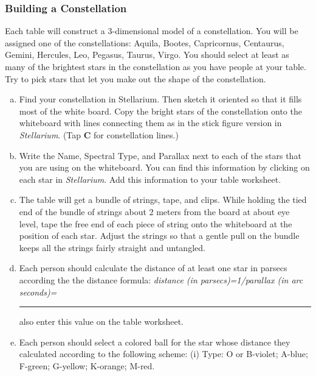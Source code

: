 \documentclass[main.tex]{subfiles}
\begin{document}
\subsubsection{Building a Constellation}
Each table will construct a 3-dimensional model of a constellation. You will be assigned one of the constellations: Aquila, Bootes, Capricornus, Centaurus, Gemini, Hercules, Leo, Pegasus, Taurus, Virgo. You should select at least as many of the brightest stars in the constellation as you have people at your table. Try to pick stars that let you make out the shape of the constellation. 
\begin{enumerate} [a.]
    \item Find your constellation in Stellarium. Then sketch it oriented so that it fills most of the white board. Copy the bright stars of the constellation onto the whiteboard with lines connecting them as in the stick figure version in \textit{Stellarium}. (Tap \textbf{C} for constellation lines.)
    \item Write the Name, Spectral Type, and Parallax next to each of the stars that you are using on the whiteboard. You can find this information by clicking on each star in \textit{Stellarium}. Add this information to your table worksheet. 
    \item The table will get a bundle of strings, tape, and clips. While holding the tied end of the bundle of strings about 2 meters from the board at about eye level, tape the free end of each piece of string onto the whiteboard at the position of each star. Adjust the strings so that a gentle pull on the bundle keeps all the strings fairly straight and untangled.
    \item Each person should calculate the distance of at least one star in parsecs according the the distance formula:
    \newline
    \newline
\textit{distance (in parsecs)=1/parallax (in arc seconds)=} \rule{2cm}{.15mm}
\newline
\newline
also enter this value on the table worksheet.
\item Each person should select a colored ball for the star whose distance they calculated according to the following scheme:
\newline
\newline
(i) Type: O or B-violet; A-blue; F-green; G-yellow; K-orange; M-red.
\newline
\newline

\end{enumerate}
\end{document}
